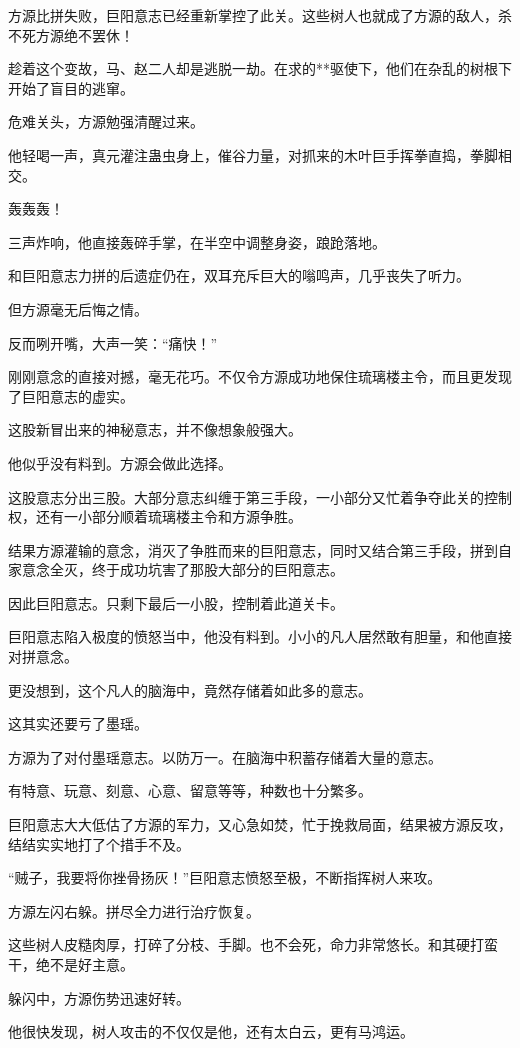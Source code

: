 \begin{this_body}
方源比拼失败，巨阳意志已经重新掌控了此关。这些树人也就成了方源的敌人，杀不死方源绝不罢休！

趁着这个变故，马、赵二人却是逃脱一劫。在求的**驱使下，他们在杂乱的树根下开始了盲目的逃窜。

危难关头，方源勉强清醒过来。

他轻喝一声，真元灌注蛊虫身上，催谷力量，对抓来的木叶巨手挥拳直捣，拳脚相交。

轰轰轰！

三声炸响，他直接轰碎手掌，在半空中调整身姿，踉跄落地。

和巨阳意志力拼的后遗症仍在，双耳充斥巨大的嗡鸣声，几乎丧失了听力。

但方源毫无后悔之情。

反而咧开嘴，大声一笑：“痛快！”

刚刚意念的直接对撼，毫无花巧。不仅令方源成功地保住琉璃楼主令，而且更发现了巨阳意志的虚实。

这股新冒出来的神秘意志，并不像想象般强大。

他似乎没有料到。方源会做此选择。

这股意志分出三股。大部分意志纠缠于第三手段，一小部分又忙着争夺此关的控制权，还有一小部分顺着琉璃楼主令和方源争胜。

结果方源灌输的意念，消灭了争胜而来的巨阳意志，同时又结合第三手段，拼到自家意念全灭，终于成功坑害了那股大部分的巨阳意志。

因此巨阳意志。只剩下最后一小股，控制着此道关卡。

巨阳意志陷入极度的愤怒当中，他没有料到。小小的凡人居然敢有胆量，和他直接对拼意念。

更没想到，这个凡人的脑海中，竟然存储着如此多的意志。

这其实还要亏了墨瑶。

方源为了对付墨瑶意志。以防万一。在脑海中积蓄存储着大量的意志。

有特意、玩意、刻意、心意、留意等等，种数也十分繁多。

巨阳意志大大低估了方源的军力，又心急如焚，忙于挽救局面，结果被方源反攻，结结实实地打了个措手不及。

“贼子，我要将你挫骨扬灰！”巨阳意志愤怒至极，不断指挥树人来攻。

方源左闪右躲。拼尽全力进行治疗恢复。

这些树人皮糙肉厚，打碎了分枝、手脚。也不会死，命力非常悠长。和其硬打蛮干，绝不是好主意。

躲闪中，方源伤势迅速好转。

他很快发现，树人攻击的不仅仅是他，还有太白云，更有马鸿运。


\end{this_body}
